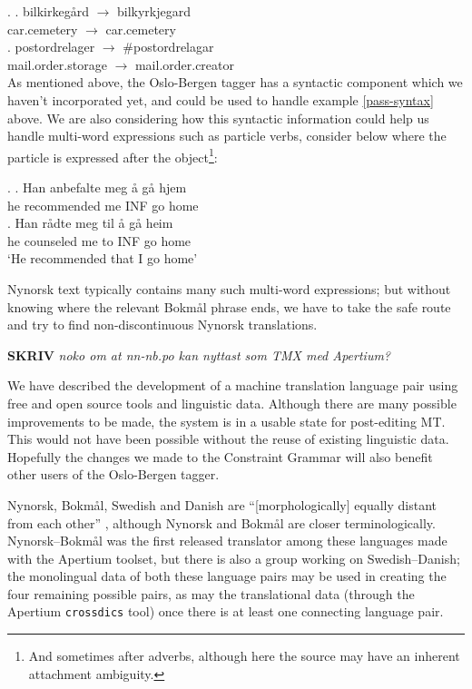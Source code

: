 \documentclass[11pt]{article}
\newcommand{\comment}[1]{\textbf{SKRIV} {\it #1}}
\begin{document}
\ex. \ag. bilkirkegård $\rightarrow$ bilkyrkjegard\\
car.cemetery $\rightarrow$ car.cemetery\\
\bg. postordrelager $\rightarrow$ \#postordrelagar\\
mail.order.storage $\rightarrow$ mail.order.creator\\

As mentioned above, the Oslo-Bergen tagger has a syntactic component
which we haven't incorporated yet, and could be used to handle example
\ref{pass-syntax} above. We are also considering how this syntactic
information could help us handle multi-word expressions such as
particle verbs, consider \Next below where the particle is expressed
after the object\footnote{And sometimes after adverbs, although
  here the source may have an inherent attachment ambiguity.}:

\ex. \ag. Han anbefalte meg å gå hjem\\
he recommended me INF go home\\
\bg. Han rådte meg til å gå heim\\
he counseled me to INF go home\\
`He recommended that I go home'

Nynorsk text typically contains many such multi-word expressions; but
without knowing where the relevant Bokmål phrase ends, we have to take
the safe route and try to find non-discontinuous Nynorsk translations.

\comment{ noko om at nn-nb.po kan nyttast som TMX med Apertium?}

We have described the development of a machine translation language
pair using free and open source tools and linguistic data. Although
there are many possible improvements to be made, the system is in a
usable state for post-editing MT. This would not have been possible
without the reuse of existing linguistic data. Hopefully the changes
we made to the Constraint Grammar will also benefit other users of the
Oslo-Bergen tagger. 

Nynorsk, Bokmål, Swedish and Danish are ``[morphologically] equally
distant from each other'' \citep[p.~1]{everson2000sln}, although
Nynorsk and Bokmål are closer terminologically. Nynorsk–Bokmål was the
first released translator among these languages made with the Apertium
toolset, but there is also a group working on Swedish–Danish; the
monolingual data of both these language pairs may be used in creating
the four remaining possible pairs, as may the translational data
(through the Apertium {\tt crossdics} tool) once there is at least one
connecting language pair. 
\end{document}
